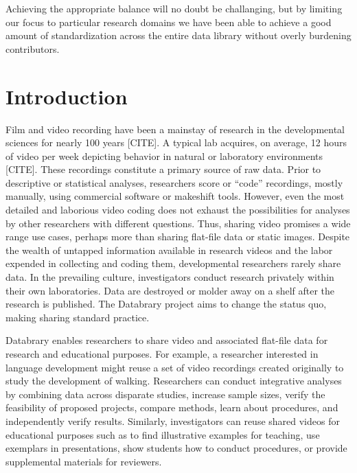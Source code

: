 \documentclass{sig-alternate}
\begin{document}
Achieving the appropriate balance will no doubt be challanging, but by limiting our focus to particular research domains we have been able to achieve a good amount of standardization across the entire data library without overly burdening contributors.


\section{Introduction}

Film and video recording have been a mainstay of research in the
developmental sciences for nearly 100 years [CITE]. A typical lab
acquires, on average, 12 hours of video per week depicting behavior in
natural or laboratory environments [CITE]. These recordings constitute a
primary source of raw data. Prior to descriptive or statistical
analyses, researchers score or “code” recordings, mostly manually, using
commercial software or makeshift tools. However, even the most detailed
and laborious video coding does not exhaust the possibilities for
analyses by other researchers with different questions. Thus, sharing
video promises a wide range use cases, perhaps more than sharing
flat-file data or static images. Despite the wealth of untapped
information available in research videos and the labor expended in
collecting and coding them, developmental researchers rarely share data.
In the prevailing culture, investigators conduct research privately
within their own laboratories. Data are destroyed or molder away on a
shelf after the research is published. The Databrary project aims to
change the status quo, making sharing standard practice.

Databrary enables researchers to share video and associated flat-file
data for research and educational purposes. For example, a researcher
interested in language development might reuse a set of video recordings
created originally to study the development of walking. Researchers can
conduct integrative analyses by combining data across disparate studies,
increase sample sizes, verify the feasibility of proposed projects,
compare methods, learn about procedures, and independently verify
results. Similarly, investigators can reuse shared videos for
educational purposes such as to find illustrative examples for teaching,
use exemplars in presentations, show students how to conduct procedures,
or provide supplemental materials for reviewers.
\end{document}
